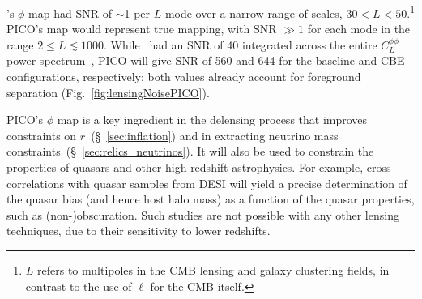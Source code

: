 \documentclass[PICOReport.tex]{subfiles}
\begin{document}
\planck 's $\phi$ map had \ac{SNR} of $\sim$1 per $L$ mode over a narrow range of scales, $30 < L < 50$.\footnote{$L$ refers to multipoles in the CMB lensing and galaxy clustering fields, in contrast to the use of $\ell$  for the CMB itself. } PICO's map would represent true mapping, with \ac{SNR} $\gg1$ for each mode in the range $2 \leq L \lesssim 1000$.  While \planck\ had an \ac{SNR} of 40 integrated across the entire $C_{L}^{\phi \phi}$ power spectrum~\citep{2018arXiv180706210P}, PICO will give \ac{SNR} of 560 and 644 for the baseline and CBE configurations, respectively; both values already account for foreground separation (Fig.~\ref{fig:lensingNoisePICO}). 

PICO's $\phi$ map is a key ingredient in the delensing process that improves constraints on $r$~(\S~\ref{sec:inflation}) and in extracting neutrino mass constraints~(\S~\ref{sec:relics_neutrinos}). It will also be used to constrain the properties of quasars and other high-redshift astrophysics.  For example, cross-correlations with quasar samples from DESI will yield a precise determination of the quasar bias (and hence host halo mass) as a function of the quasar properties, such as (non-)obscuration.  Such studies are not possible with any other lensing techniques, due to their sensitivity to lower redshifts.

\end{document}
